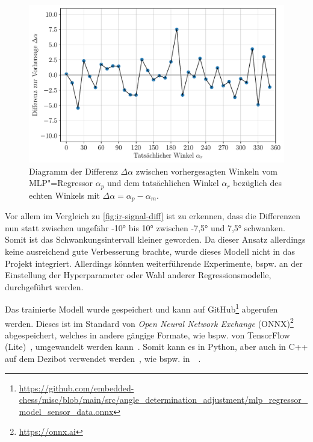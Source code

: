 \begin{figure}[h]
    \centering
    \includegraphics[width=\textwidth]{../plot/angle_adjustment/mlp_sensor_diff.pdf}
    \caption{Diagramm der Differenz $\Delta\alpha$ zwischen vorhergesagten Winkeln vom MLP"=Regressor $\alpha_p$ und dem tatsächlichen Winkel $\alpha_r$ bezüglich des echten Winkels mit $\Delta\alpha = \alpha_p - \alpha_m$.}
    \label{fig:cnn-mlp-diff}
\end{figure}

Vor allem im Vergleich zu \autoref{fig:ir-signal-diff} ist zu erkennen, dass die Differenzen nun statt zwischen ungefähr -10° bis 10° zwischen -7,5° und 7,5° schwanken. Somit ist das Schwankungsintervall kleiner geworden. Da dieser Ansatz allerdings keine ausreichend gute Verbesserung brachte, wurde dieses Modell nicht in das Projekt integriert. Allerdings könnten weiterführende Experimente, bspw. an der Einstellung der Hyperparameter oder Wahl anderer Regressionsmodelle, durchgeführt werden.

Das trainierte Modell wurde gespeichert und kann auf GitHub\footnote{\url{https://github.com/embedded-chess/misc/blob/main/src/angle_determination_adjustment/mlp_regressor_model_sensor_data.onnx}} abgerufen werden. Dieses ist im Standard von \emph{Open Neural Network Exchange} (ONNX)\footnote{\url{https://onnx.ai}} abgespeichert, welches in andere gängige Formate, wie bspw. von TensorFlow (Lite)~\cite{hyodoToolsConvertONNX2025, internationalbusinessmachinescorporationOnnxOnnxtensorflow2022}, umgewandelt werden kann~\cite{scikit-learndevelopersModelPersistence2025}. Somit kann es in Python, aber auch in C++ auf dem Dezibot verwendet werden~\cite{espressifsystemsEspressifEsptflitemicro2025,thetensorflowauthorsTanakamasayukiArduino_TensorFlowLite_ESP322022}, wie bspw. in~\citeauthor{antonovSnskorpion2DezibotLabyrinthSolver2025}~\cite{antonovSnskorpion2DezibotLabyrinthSolver2025}.


